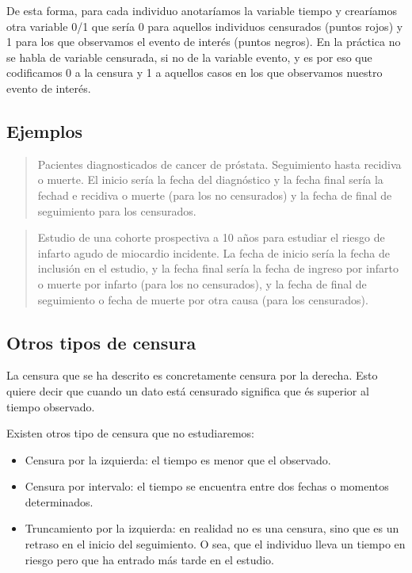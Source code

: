 \documentclass[
]{book}
\begin{document}
De esta forma, para cada individuo anotaríamos la variable tiempo y crearíamos otra variable 0/1 que sería 0 para aquellos individuos censurados (puntos rojos) y 1 para los que observamos el evento de interés (puntos negros). En la práctica no se habla de variable censurada, si no de la variable evento, y es por eso que codificamos 0 a la censura y 1 a aquellos casos en los que observamos nuestro evento de interés.

\hypertarget{ejemplos-3}{%
\subsection{Ejemplos}\label{ejemplos-3}}

\begin{quote}
Pacientes diagnosticados de cancer de próstata. Seguimiento hasta recidiva o muerte.
El inicio sería la fecha del diagnóstico y la fecha final sería la fechad e recidiva o muerte (para los no censurados) y la fecha de final de seguimiento para los censurados.
\end{quote}

\begin{quote}
Estudio de una cohorte prospectiva a 10 años para estudiar el riesgo de infarto agudo de miocardio incidente. La fecha de inicio sería la fecha de inclusión en el estudio, y la fecha final sería la fecha de ingreso por infarto o muerte por infarto (para los no censurados), y la fecha de final de seguimiento o fecha de muerte por otra causa (para los censurados).
\end{quote}

\hypertarget{otros-tipos-de-censura}{%
\subsection{Otros tipos de censura}\label{otros-tipos-de-censura}}

La censura que se ha descrito es concretamente censura por la derecha. Esto quiere decir que cuando un dato está censurado significa que és superior al tiempo observado.

Existen otros tipo de censura que no estudiaremos:

\begin{itemize}
\item
  Censura por la izquierda: el tiempo es menor que el observado.
\item
  Censura por intervalo: el tiempo se encuentra entre dos fechas o momentos determinados.
\item
  Truncamiento por la izquierda: en realidad no es una censura, sino que es un retraso en el inicio del seguimiento. O sea, que el individuo lleva un tiempo en riesgo pero que ha entrado más tarde en el estudio.
\end{itemize}
\end{document}

